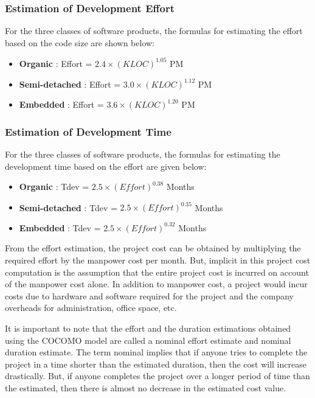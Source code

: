 \subsubsection{Estimation of Development Effort}
For the three classes of software products, the formulas for estimating the effort based on the code size are shown below:

\begin{itemize}
 \item \textbf{Organic} : Effort = $2.4 \times (KLOC) ^ {1.05}$ PM
 \item \textbf{Semi-detached} : Effort = $3.0 \times (KLOC) ^ {1.12}$ PM
 \item \textbf{Embedded} : Effort = $3.6 \times (KLOC) ^ {1.20}$ PM
\end{itemize}

\subsubsection{Estimation of Development Time}
For the three classes of software products, the formulas for estimating the development time based on the effort are given below:

\begin{itemize}
 \item \textbf{Organic} : Tdev = $2.5 \times (Effort) ^ {0.38}$ Months
 \item \textbf{Semi-detached} : Tdev = $2.5 \times (Effort) ^ {0.35}$ Months
 \item \textbf{Embedded} : Tdev = $2.5 \times (Effort) ^ {0.32}$ Months
\end{itemize}

From the effort estimation, the project cost can be obtained by multiplying the required effort by the manpower cost per month. But, implicit in this project cost computation is the assumption that the entire project cost is incurred on account of the manpower cost alone. In addition to manpower cost, a project would incur costs due to hardware and software required for the project and the company overheads for administration, office space, etc.

It is important to note that the effort and the duration estimations obtained using the COCOMO model are called a nominal effort estimate and nominal duration estimate. The term nominal implies that if anyone tries to complete the project in a time shorter than the estimated duration, then the cost will increase drastically. But, if anyone completes the project over a longer period of time than the estimated, then there is almost no decrease in the estimated cost value.


